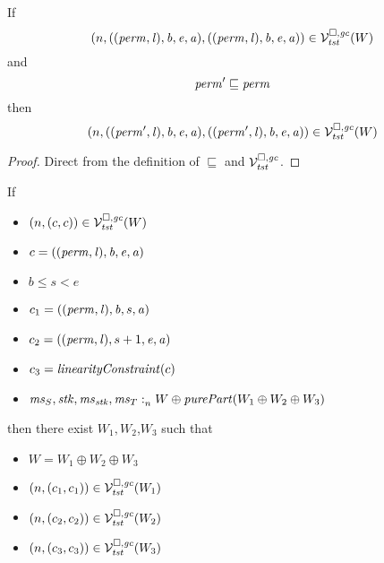 \begin{lemma}
  \label{lem:cap-in-lrv-mono-perm}
  If
  \[
    \left(n,((\mathit{perm},\mathit{l}),\mathit{b},\mathit{e},\mathit{a}),((\mathit{perm},\mathit{l}),\mathit{b},\mathit{e},\mathit{a})\right) \in \mathcal{V}^{\square,\mathit{gc}}_{\mathit{tst}}(W)
  \]
  and
  \[
    \mathit{perm}' \sqsubseteq \mathit{perm}
  \]
  then
  \[
    \left(n,((\mathit{perm}',\mathit{l}),\mathit{b},\mathit{e},\mathit{a}),((\mathit{perm}',\mathit{l}),\mathit{b},\mathit{e},\mathit{a})\right) \in \mathcal{V}^{\square,\mathit{gc}}_{\mathit{tst}}(W)
  \]
\end{lemma}
\begin{proof}
  Direct from the definition of $\sqsubseteq$ and $\mathcal{V}^{\square,\mathit{gc}}_{\mathit{tst}}$.
\end{proof}

\begin{lemma}
  \label{lem:splitting-safety-normal}
  If
  \begin{itemize}
  \item $\left(n,(c,c)\right) \in \mathcal{V}^{\square,\mathit{gc}}_{\mathit{tst}}(W)$
  \item $c = ((\mathit{perm},\mathit{l}),\mathit{b},\mathit{e},\mathit{a})$
  \item $b \le s < e$
  \item $c_1 = ((\mathit{perm},\mathit{l}),\mathit{b},s,\mathit{a})$
  \item $c_2 = ((\mathit{perm},\mathit{l}),s+1,\mathit{e},\mathit{a})$
  \item $c_3 = \linCons{c}$
  \item $\memSat{\ms_S,\stk,\ms_\stk,\ms_T}{W \oplus \purePart{W_1 \oplus W_2 \oplus W_3}}$
  \end{itemize}
  then there exist $W_1,W_2$,$W_3$ such that
  \begin{itemize}
  \item $W = W_1 \oplus W_2 \oplus W_3$
  \item $\left(n,(c_1,c_1)\right) \in \mathcal{V}^{\square,\mathit{gc}}_{\mathit{tst}}(W_1)$
  \item $\left(n,(c_2,c_2)\right) \in \mathcal{V}^{\square,\mathit{gc}}_{\mathit{tst}}(W_2)$
  \item $\left(n,(c_3,c_3)\right) \in \mathcal{V}^{\square,\mathit{gc}}_{\mathit{tst}}(W_3)$
  \end{itemize}
\end{lemma}
